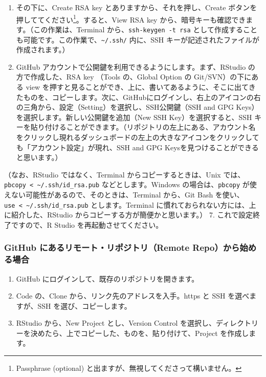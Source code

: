 \documentclass[
]{bxjsbook}
\providecommand{\tightlist}{%
  \setlength{\itemsep}{0pt}\setlength{\parskip}{0pt}}
\theoremstyle{definition}
\theoremstyle{definition}
\theoremstyle{definition}
\theoremstyle{definition}
\theoremstyle{remark}
\begin{document}
\begin{enumerate}
\def\labelenumi{\arabic{enumi}.}
\setcounter{enumi}{4}
\tightlist
\item
  その下に、Create RSA key とありますから、それを押し、Create ボタンを押しててください\footnote{Passphrase (optional) と出ますが、無視してくださって構いません。}。すると、View RSA key から、暗号キーも確認できます。（この作業は、Terminal から、\texttt{ssh-keygen\ -t\ rsa} として作成することも可能です。この作業で、\texttt{\textasciitilde{}/.ssh/} 内に、SSH キーが記述されたファイルが作成されます。）
\item
  GitHub アカウントで公開鍵を利用できるようにします。まず、RStudio の方で作成した、RSA key （Tools の、Global Option の Git/SVN）の下にある view を押すと見ることができ、上に、書いてあるように、そこに出てきたものを、コピーします。次に、GitHubにログインし、右上のアイコンの右の三角から、設定（Setting）を選択し、SSH公開鍵（SSH and GPG Keys）を選択します。新しい公開鍵を追加（New SSH Key）を選択すると、SSH キーを貼り付けることができます。（リポジトリの左上にある、アカウント名をクリックし現れるダッシュボードの左上の大きなアイコンをクリックしても「アカウント設定」が現れ、SSH and GPG Keysを見つけることができると思います。）
\end{enumerate}

（なお、RStudio ではなく、Terminal からコピーするときは、Unix では、\texttt{pbcopy\ \textless{}\ \textasciitilde{}/.ssh/id\_rsa.pub} などとします。Windows の場合は、\texttt{pbcopy} が使えない可能性があるので、そのときは、Terminal から、Git Bash を使い、\texttt{use\ \textless{}\ \textasciitilde{}/.ssh/id\_rsa.pub} とします。Terminal に慣れておられない方には、上に紹介した、RStudio からコピーする方が簡便かと思います。）
7. これで設定終了ですので、R Studio を再起動させてください。

\hypertarget{github-ux306bux3042ux308bux30eaux30e2ux30fcux30c8ux30eaux30ddux30b8ux30c8ux30earemote-repoux304bux3089ux59cbux3081ux308bux5834ux5408}{%
\subsubsection{GitHub にあるリモート・リポジトリ（Remote Repo）から始める場合}\label{github-ux306bux3042ux308bux30eaux30e2ux30fcux30c8ux30eaux30ddux30b8ux30c8ux30earemote-repoux304bux3089ux59cbux3081ux308bux5834ux5408}}

\begin{enumerate}
\def\labelenumi{\arabic{enumi}.}
\tightlist
\item
  GitHub にログインして、既存のリポジトリを開きます。
\item
  Code の、Clone から、リンク先のアドレスを入手。https と SSH を選べますが、SSH を選び、コピーします。
\item
  RStudio から、New Project とし、Version Control を選択し、ディレクトリーを決めたら、上でコピーした、ものを、貼り付けて、Project を作成します。
\end{enumerate}
\end{document}
